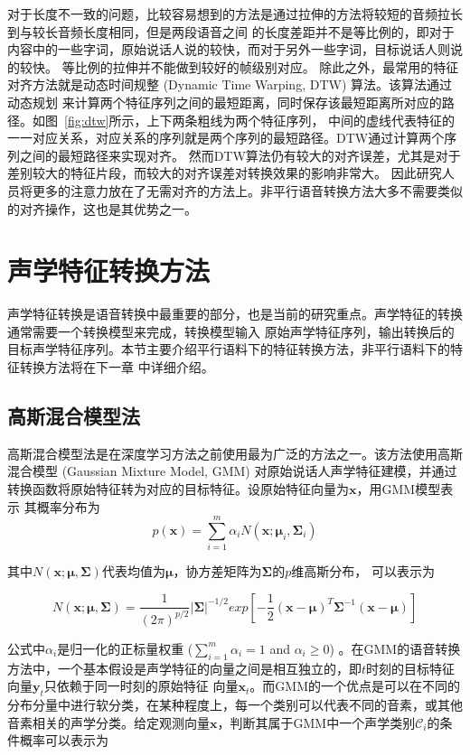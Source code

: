 对于长度不一致的问题，比较容易想到的方法是通过拉伸的方法将较短的音频拉长到与较长音频长度相同，但是两段语音之间
的长度差距并不是等比例的，即对于内容中的一些字词，原始说话人说的较快，而对于另外一些字词，目标说话人则说的较快。
等比例的拉伸并不能做到较好的帧级别对应。
除此之外，最常用的特征对齐方法就是动态时间规整 (Dynamic Time Warping, DTW) 算法。该算法通过动态规划
来计算两个特征序列之间的最短距离，同时保存该最短距离所对应的路径。如图~\ref{fig:dtw}所示，上下两条粗线为两个特征序列，
中间的虚线代表特征的一一对应关系，对应关系的序列就是两个序列的最短路径。DTW通过计算两个序列之间的最短路径来实现对齐。
然而DTW算法仍有较大的对齐误差，尤其是对于差别较大的特征片段，而较大的对齐误差对转换效果的影响非常大。
因此研究人员将更多的注意力放在了无需对齐的方法上。非平行语音转换方法大多不需要类似的对齐操作，这也是其优势之一。

\section{声学特征转换方法}
声学特征转换是语音转换中最重要的部分，也是当前的研究重点。声学特征的转换通常需要一个转换模型来完成，转换模型输入
原始声学特征序列，输出转换后的目标声学特征序列。本节主要介绍平行语料下的特征转换方法，非平行语料下的特征转换方法将在下一章
中详细介绍。

\subsection{高斯混合模型法}
高斯混合模型法是在深度学习方法之前使用最为广泛的方法之一。该方法使用高斯混合模型 (Gaussian Mixture Model, GMM) 
对原始说话人声学特征建模，并通过转换函数将原始特征转为对应的目标特征。设原始特征向量为$\mathbf{x}$，用GMM模型表示
其概率分布为
\begin{equation}
    \label{eq:gmm}
    p(\mathbf{x})=\sum^{m}_{i=1}\alpha_iN(\mathbf{x};\bm{\mu}_i,\bm{\Sigma}_i)
\end{equation}

其中$N(\mathbf{x};\bm{\mu},\bm{\Sigma})$代表均值为$\bm{\mu}$，协方差矩阵为$\bm{\Sigma}$的$p$维高斯分布，
可以表示为

\begin{equation}
    N(\mathbf{x};\bm{\mu},\bm{\Sigma})=\frac{1}{(2\pi)^{p/2}}\left| \bm{\Sigma} \right|^{-1/2} exp\left[ -\frac{1}{2}(\mathbf{x}-\bm{\mu})^{T}\bm{\Sigma}^{-1}(\mathbf{x}-\bm{\mu}) \right]
\end{equation}

公式中$\alpha_i$是归一化的正标量权重 ($\sum^{m}_{i=1}\alpha_i=1$ and $\alpha_i \ge 0$) 。在GMM的语音转换
方法中，一个基本假设是声学特征的向量之间是相互独立的，即$t$时刻的目标特征向量$\mathbf{y}_t$只依赖于同一时刻的原始特征
向量$\mathbf{x}_t$。而GMM的一个优点是可以在不同的分布分量中进行软分类，在某种程度上，每一个类别可以代表不同的音素，或其他
音素相关的声学分类。给定观测向量$\mathbf{x}$，判断其属于GMM中一个声学类别$\mathcal{C}_i$的条件概率可以表示为


